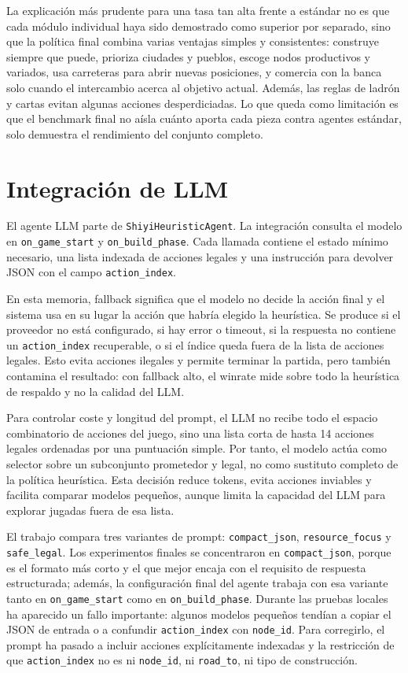 ﻿\documentclass[10pt,a4paper]{article}
\begin{document}
La explicación más prudente para una tasa tan alta frente a estándar no es que cada módulo individual haya sido demostrado como superior por separado, sino que la política final combina varias ventajas simples y consistentes: construye siempre que puede, prioriza ciudades y pueblos, escoge nodos productivos y variados, usa carreteras para abrir nuevas posiciones, y comercia con la banca solo cuando el intercambio acerca al objetivo actual. Además, las reglas de ladrón y cartas evitan algunas acciones desperdiciadas. Lo que queda como limitación es que el benchmark final no aísla cuánto aporta cada pieza contra agentes estándar, solo demuestra el rendimiento del conjunto completo.

\section{Integración de LLM}
El agente LLM parte de \texttt{ShiyiHeuristicAgent}. La integración consulta el modelo en \texttt{on\_game\_start} y \texttt{on\_build\_phase}. Cada llamada contiene el estado mínimo necesario, una lista indexada de acciones legales y una instrucción para devolver JSON con el campo \texttt{action\_index}.

En esta memoria, fallback significa que el modelo no decide la acción final y el sistema usa en su lugar la acción que habría elegido la heurística. Se produce si el proveedor no está configurado, si hay error o timeout, si la respuesta no contiene un \texttt{action\_index} recuperable, o si el índice queda fuera de la lista de acciones legales. Esto evita acciones ilegales y permite terminar la partida, pero también contamina el resultado: con fallback alto, el winrate mide sobre todo la heurística de respaldo y no la calidad del LLM.

Para controlar coste y longitud del prompt, el LLM no recibe todo el espacio combinatorio de acciones del juego, sino una lista corta de hasta 14 acciones legales ordenadas por una puntuación simple. Por tanto, el modelo actúa como selector sobre un subconjunto prometedor y legal, no como sustituto completo de la política heurística. Esta decisión reduce tokens, evita acciones inviables y facilita comparar modelos pequeños, aunque limita la capacidad del LLM para explorar jugadas fuera de esa lista.

El trabajo compara tres variantes de prompt: \texttt{compact\_json}, \texttt{resource\_focus} y \texttt{safe\_legal}. Los experimentos finales se concentraron en \texttt{compact\_json}, porque es el formato más corto y el que mejor encaja con el requisito de respuesta estructurada; además, la configuración final del agente trabaja con esa variante tanto en \texttt{on\_game\_start} como en \texttt{on\_build\_phase}. Durante las pruebas locales ha aparecido un fallo importante: algunos modelos pequeños tendían a copiar el JSON de entrada o a confundir \texttt{action\_index} con \texttt{node\_id}. Para corregirlo, el prompt ha pasado a incluir acciones explícitamente indexadas y la restricción de que \texttt{action\_index} no es ni \texttt{node\_id}, ni \texttt{road\_to}, ni tipo de construcción.
\end{document}
